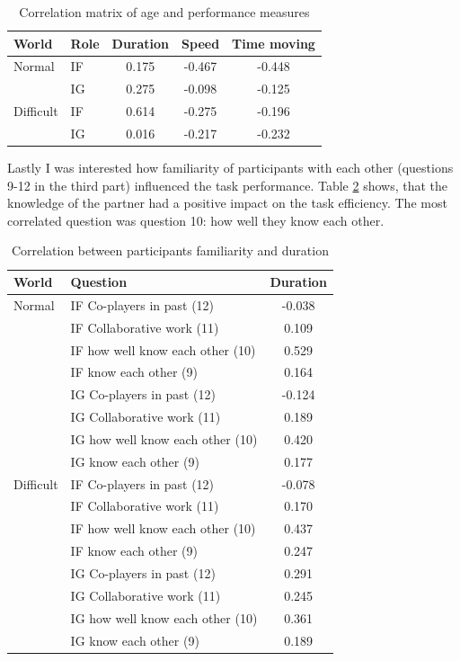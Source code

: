 \begin{table}[!htbp]
 \centering
\begin{tabular}{llccc}
\toprule
World & Role  & Duration & Speed & Time moving  \\
\midrule
Normal 	& IF & 0.175 & -0.467 & -0.448\\
 		& IG & 0.275 & -0.098 & -0.125\\
\midrule
Difficult& IF & 0.614 &	-0.275 &-0.196\\
 		& IG  & 0.016 &	-0.217 &-0.232\\
\bottomrule
\end{tabular}
\caption{Correlation matrix of age and performance measures}
\label{tab:demfactors-age}
\end{table}

Lastly I was interested how familiarity of participants with each other (questions 9-12 in the third part) influenced the task performance. Table \ref{tab:demfactors-famother} shows, that the knowledge of the partner had a positive impact on the task efficiency. The most correlated question was question 10: how well they know each other.

\begin{table}[!htbp]
 \centering
\begin{tabular}{llc}
\toprule
World & Question  & Duration \\
\midrule
Normal 	& IF Co-players in past (12) 	& -0.038\\
 		& IF Collaborative work 	(11)		& 0.109	 \\
 		& IF how well know each other (10)		& 0.529\\
 		& IF know each other (9)			& 0.164	\\
 		& IG Co-players in past (12) 	& -0.124\\
 		& IG Collaborative work 	(11)		& 0.189	 \\
 		& IG how well know each other (10)		& 0.420\\
 		& IG know each other (9)			& 0.177	\\
\midrule
Difficult& IF Co-players in past (12) 	& -0.078\\
 		& IF Collaborative work 	(11)		& 0.170	 \\
  		& IF how well know each other (10)		& 0.437\\
 		& IF know each other (9)			& 0.247	\\
 		& IG Co-players in past (12) 	& 0.291\\
 		& IG Collaborative work 	(11)		& 0.245	 \\
 		& IG how well know each other (10)		& 0.361\\
 		& IG know each other (9)			& 0.189	\\
\bottomrule
\end{tabular}
\caption{Correlation between participants familiarity and duration}
\label{tab:demfactors-famother}
\end{table}

